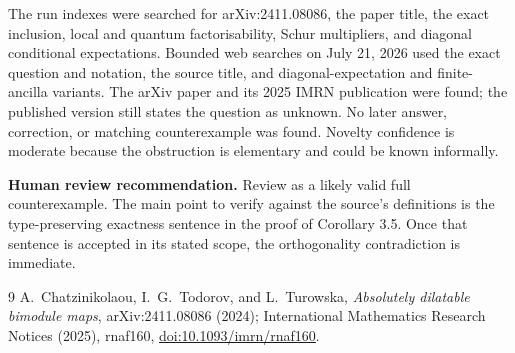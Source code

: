 \documentclass[11pt]{article}
\begin{document}
The run indexes were searched for arXiv:2411.08086, the paper title, the exact
inclusion, local and quantum factorisability, Schur multipliers, and diagonal
conditional expectations.  Bounded web searches on July 21, 2026 used the
exact question and notation, the source title, and diagonal-expectation and
finite-ancilla variants.  The arXiv paper and its 2025 IMRN publication were
found; the published version still states the question as unknown.  No later
answer, correction, or matching counterexample was found.  Novelty confidence
is moderate because the obstruction is elementary and could be known
informally.

\medskip
\noindent
\textbf{Human review recommendation.} Review as a likely valid full
counterexample.  The main point to verify against the source's definitions is
the type-preserving exactness sentence in the proof of Corollary 3.5.  Once
that sentence is accepted in its stated scope, the orthogonality contradiction
is immediate.

\begin{thebibliography}{9}
A.~Chatzinikolaou, I.~G.~Todorov, and L.~Turowska,
\emph{Absolutely dilatable bimodule maps}, arXiv:2411.08086 (2024);
International Mathematics Research Notices (2025), rnaf160,
\href{https://doi.org/10.1093/imrn/rnaf160}{doi:10.1093/imrn/rnaf160}.
\end{thebibliography}
\end{document}
